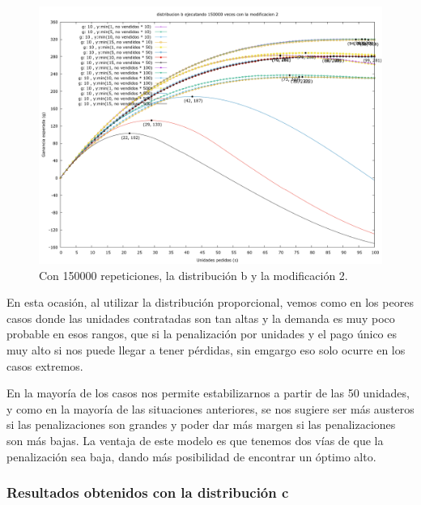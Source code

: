 \documentclass[12pt, spanish]{article}
\begin{document}
\begin{figure}[H]
	\centering
	\includegraphics[scale = 0.2]{prob_b/datos_b_150000_2.png}
	\caption{Con 150000 repeticiones, la distribución b y la modificación 2.}
	\label{fig:ej1_a_150000}

\end{figure}


En esta ocasión, al utilizar la distribución proporcional, vemos como en los peores casos donde las unidades contratadas son tan altas y la demanda es muy poco probable en esos rangos, que si la penalización por unidades y el pago único es muy alto si nos puede llegar a tener pérdidas, sin emgargo eso solo ocurre en los casos extremos.

En la mayoría de los casos nos permite estabilizarnos a partir de las 50 unidades, y como en la mayoría de las situaciones anteriores, se nos sugiere ser más austeros si las penalizaciones son grandes y poder dar más margen si las penalizaciones son más bajas. La ventaja de este modelo es que tenemos dos vías de que la penalización sea baja, dando más posibilidad de encontrar un óptimo alto.

\subsubsection{Resultados obtenidos con la distribución c}
\end{document}
